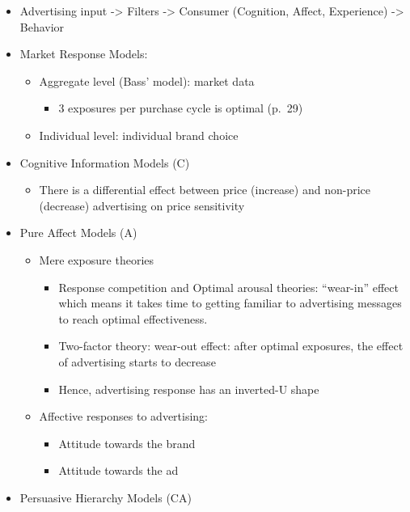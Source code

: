 \documentclass[
]{book}
\providecommand{\tightlist}{%
  \setlength{\itemsep}{0pt}\setlength{\parskip}{0pt}}
\begin{document}
\citep{vakratsas1999}

\begin{itemize}
\item
  Advertising input -\textgreater{} Filters -\textgreater{} Consumer (Cognition, Affect, Experience) -\textgreater{} Behavior
\item
  Market Response Models:

  \begin{itemize}
  \item
    Aggregate level (Bass' model): market data

    \begin{itemize}
    \tightlist
    \item
      3 exposures per purchase cycle is optimal (p.~29)
    \end{itemize}
  \item
    Individual level: individual brand choice
  \end{itemize}
\item
  Cognitive Information Models (C)

  \begin{itemize}
  \tightlist
  \item
    There is a differential effect between price (increase) and non-price (decrease) advertising on price sensitivity
  \end{itemize}
\item
  Pure Affect Models (A)

  \begin{itemize}
  \item
    Mere exposure theories

    \begin{itemize}
    \item
      Response competition and Optimal arousal theories: ``wear-in'' effect which means it takes time to getting familiar to advertising messages to reach optimal effectiveness.
    \item
      Two-factor theory: wear-out effect: after optimal exposures, the effect of advertising starts to decrease
    \item
      Hence, advertising response has an inverted-U shape
    \end{itemize}
  \item
    Affective responses to advertising:

    \begin{itemize}
    \item
      Attitude towards the brand
    \item
      Attitude towards the ad
    \end{itemize}
  \end{itemize}
\item
  Persuasive Hierarchy Models (CA)


\end{itemize}
\end{document}
